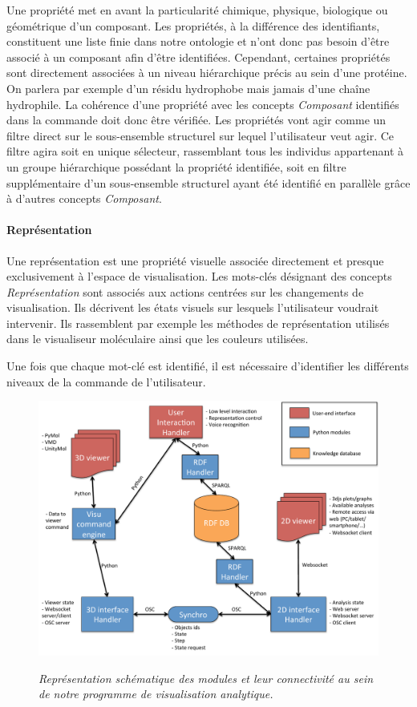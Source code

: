 Une propriété met en avant la particularité chimique, physique, biologique ou géométrique d'un composant. Les propriétés, à la différence des identifiants, constituent une liste finie dans notre ontologie et n'ont donc pas besoin d'être associé à un composant afin d'être identifiées. Cependant, certaines propriétés sont directement associées à un niveau hiérarchique précis au sein d'une protéine. On parlera par exemple d'un résidu hydrophobe mais jamais d'une chaîne hydrophile. La cohérence d'une propriété avec les concepts \textit{Composant} identifiés dans la commande doit donc être vérifiée. 
Les propriétés vont agir comme un filtre direct sur le sous-ensemble structurel sur lequel l'utilisateur veut agir. Ce filtre agira soit en unique sélecteur, rassemblant tous les individus appartenant à un groupe hiérarchique possédant la propriété identifiée, soit en filtre supplémentaire d'un sous-ensemble structurel ayant été identifié en parallèle grâce à d'autres concepts \textit{Composant}.

\paragraph{Représentation}

Une représentation est une propriété visuelle associée directement et presque exclusivement à l'espace de visualisation. Les mots-clés désignant des concepts \textit{Représentation} sont associés aux actions centrées sur les changements de visualisation. Ils décrivent les états visuels sur lesquels l'utilisateur voudrait intervenir. Ils rassemblent par exemple les méthodes de représentation utilisés dans le visualiseur moléculaire ainsi que les couleurs utilisées.

Une fois que chaque mot-clé est identifié, il est nécessaire d'identifier les différents niveaux de la commande de l'utilisateur.

\begin{figure}
  \centering
  {\includegraphics[width=.75\linewidth]{./figures/ch4/ch4_visu_ana_semantic_schema.pdf}}
    \caption{{\it Représentation schématique des modules et leur connectivité au sein de notre programme de visualisation analytique.}}
  \label{Fig:schema_prog_visu_ana}
  \hspace{0.3cm}
\end{figure}

